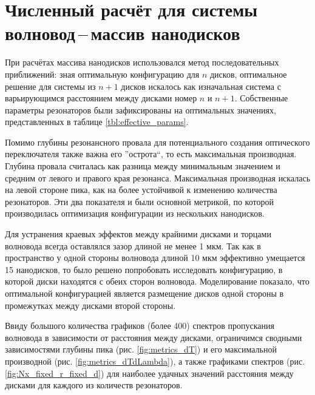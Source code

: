 \section{Численный расчёт для системы волновод\,--\,массив нанодисков}

При расчётах массива нанодисков использовался метод последовательных приближений: зная оптимальную конфигурацию для $n$ дисков, оптимальное решение для системы из $n+1$ дисков искалось как изначальная система с варьирующимся расстоянием между дисками номер $n$ и $n+1$. Собственные параметры резонаторов были зафиксированы на оптимальных значениях, представленных в таблице \ref{tbl:effective_params}.

Помимо глубины резонансного провала для потенциального создания оптического переключателя также важна его ''острота``, то есть максимальная производная. Глубина провала считалась как разница между минимальным значением и средним от левого и правого края резонанса. Максимальная производная искалась на левой стороне пика, как на более устойчивой к изменению количества резонаторов. Эти два показателя и были основной метрикой, по которой производилась оптимизация конфигурации из нескольких нанодисков.

Для устранения краевых эффектов между крайними дисками и торцами волновода всегда оставлялся зазор длиной не менее 1 мкм. Так как в пространство у одной стороны волновода длиной 10 мкм эффективно умещается 15 нанодисков, то было решено попробовать исследовать конфигурацию, в которой диски находятся с обеих сторон волновода. Моделирование показало, что оптимальной конфигурацией является размещение дисков одной стороны в промежутках между дисками второй стороны.

Ввиду большого количества графиков (более 400) спектров пропускания волновода в зависимости от расстояния между дисками, ограничимся сводными зависимостями глубины пика (рис. \ref{fig:metrics_dT}) и его максимальной производной (рис. \ref{fig:metrics_dTdLambda}), а также графиками спектров (рис. \ref{fig:Nx_fixed_r_fixed_d}) для наиболее удачных значений расстояния между дисками для каждого из количеств резонаторов.


